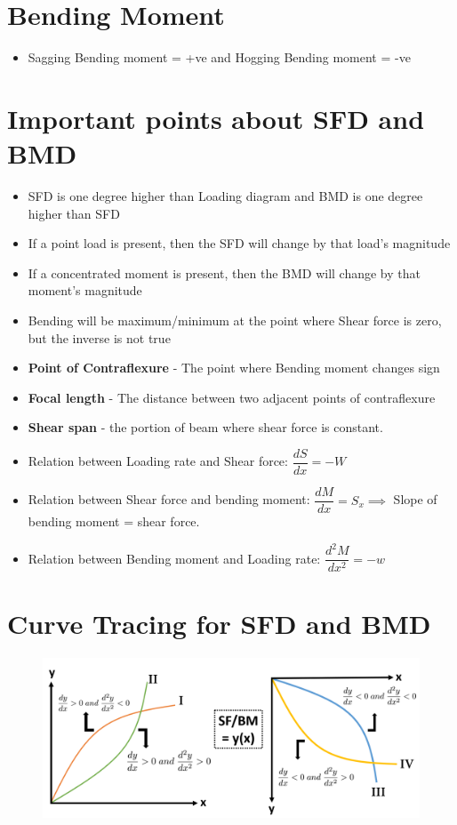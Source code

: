 \documentclass[8pt]{report}
\begin{document}
	\section{Bending Moment}
		\begin{itemize}
			\item Sagging Bending moment = +ve and Hogging Bending moment = -ve
		\end{itemize}\hrulefill
	\section{Important points about SFD and BMD}
		\begin{itemize}
			\item SFD is one degree higher than Loading diagram and BMD is one degree higher than SFD
			\item If a point load is present, then the SFD will change by that load's magnitude
			\item If a concentrated moment is present, then the BMD will change by that moment's magnitude
			\item Bending will be maximum/minimum at the point where Shear force is zero, but the inverse is not true
			\item \textbf{Point of Contraflexure} - The point where Bending moment changes sign
			\item \textbf{Focal length} - The distance between two adjacent points of contraflexure
			\item \textbf{Shear span} - the portion of beam where shear force is constant.
			\item Relation between Loading rate and Shear force: $\boxed{\dfrac{dS}{dx}=-W}$
			\item Relation between Shear force and bending moment: $\boxed{\dfrac{dM}{dx}=S_x}\implies$ Slope of bending moment = shear force.
			\item Relation between Bending moment and Loading rate: $\boxed{\dfrac{d^2M}{dx^2}=-w}$
		\end{itemize}\hrulefill
	\section{Curve Tracing for SFD and BMD}
			\begin{figure}[H]
				\centering
				\includegraphics[scale=0.4]{curvetracing.png}
			\end{figure}\hrulefill
\end{document}
